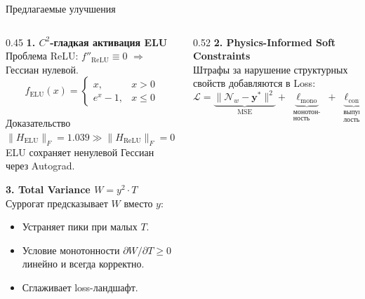 \documentclass[11pt, aspectratio=169]{beamer}
\begin{document}
\begin{frame}[shrink=8]{Предлагаемые улучшения}
  \begin{columns}[T]

    \begin{column}{0.45\textwidth}
      \textbf{1. $C^2$-гладкая активация ELU}\\[0.2em]
      \small
      Проблема ReLU: $f''_{\text{ReLU}}\!\equiv\!0$
      $\Rightarrow$ Гессиан нулевой.
      \[
        f_{\text{ELU}}(x)=\begin{cases}x,& x>0\\ e^x-1,& x\le0\end{cases}
      \]
      \begin{exampleblock}{\small Доказательство}
        \scriptsize
        $\|H_\text{ELU}\|_F=1.039 \gg \|H_\text{ReLU}\|_F=0$\\
        ELU сохраняет ненулевой Гессиан через Autograd.
      \end{exampleblock}

      \medskip
      \textbf{3. Total Variance $W = y^2\!\cdot T$}\\[0.2em]
      \small Суррогат предсказывает $W$ вместо $y$:
      \begin{itemize}\scriptsize
        \item Устраняет пики при малых $T$.
        \item Условие монотонности $\partial W/\partial T\!\ge\!0$
              линейно и всегда корректно.
        \item Сглаживает loss-ландшафт.
      \end{itemize}
    \end{column}

    \begin{column}{0.52\textwidth}
      \textbf{2. Physics-Informed Soft Constraints}\\[0.2em]
      \small
      Штрафы за нарушение структурных свойств добавляются в Loss:
      \[
        \mathcal{L}
          =\underbrace{\|\mathcal{N}_w-\mathbf{y}^*\|^2}_{\text{MSE}}
          +\underbrace{\ell_{\text{mono}}}_{\substack{\text{монотон-}\\\text{ность}}}
          +\underbrace{\ell_{\text{conv}}}_{\substack{\text{выпук-}\\\text{лость}}}
          +\underbrace{\ell_F}_{\substack{\text{жёсткий}\\\text{барьер}}}
      \]


\end{column}
\end{columns}
\end{frame}
\end{document}
